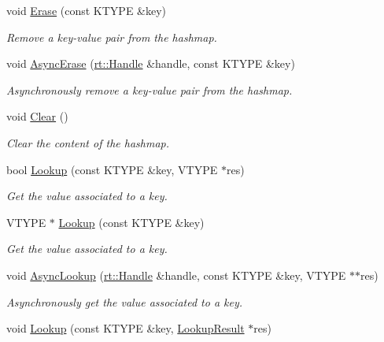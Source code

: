 \begin{DoxyCompactItemize}
void \hyperlink{classshad_1_1LocalHashmap_a5d57f63d0515acf2d53c99fb56eda93c}{Erase} (const K\-T\-Y\-P\-E \&key)
\begin{DoxyCompactList}\small\item\em Remove a key-\/value pair from the hashmap. \end{DoxyCompactList}\item 
void \hyperlink{classshad_1_1LocalHashmap_a78d00a5d4b2591cefcafb44247d9131d}{Async\-Erase} (\hyperlink{classshad_1_1rt_1_1Handle}{rt\-::\-Handle} \&handle, const K\-T\-Y\-P\-E \&key)
\begin{DoxyCompactList}\small\item\em Asynchronously remove a key-\/value pair from the hashmap. \end{DoxyCompactList}\item 
void \hyperlink{classshad_1_1LocalHashmap_a4e95baa9af6646d2c66adc1b8ae5781c}{Clear} ()
\begin{DoxyCompactList}\small\item\em Clear the content of the hashmap. \end{DoxyCompactList}\item 
bool \hyperlink{classshad_1_1LocalHashmap_a0365f5c68c75b04109639e8f65cc8eb0}{Lookup} (const K\-T\-Y\-P\-E \&key, V\-T\-Y\-P\-E $\ast$res)
\begin{DoxyCompactList}\small\item\em Get the value associated to a key. \end{DoxyCompactList}\item 
V\-T\-Y\-P\-E $\ast$ \hyperlink{classshad_1_1LocalHashmap_ae37645e79a683b4bc8c096a37cacf74d}{Lookup} (const K\-T\-Y\-P\-E \&key)
\begin{DoxyCompactList}\small\item\em Get the value associated to a key. \end{DoxyCompactList}\item 
void \hyperlink{classshad_1_1LocalHashmap_ab80af4eef1ce16673c1895bd6cd3951b}{Async\-Lookup} (\hyperlink{classshad_1_1rt_1_1Handle}{rt\-::\-Handle} \&handle, const K\-T\-Y\-P\-E \&key, V\-T\-Y\-P\-E $\ast$$\ast$res)
\begin{DoxyCompactList}\small\item\em Asynchronously get the value associated to a key. \end{DoxyCompactList}\item 
void \hyperlink{classshad_1_1LocalHashmap_a9bd1b3780c1c676ce8d5eae265030080}{Lookup} (const K\-T\-Y\-P\-E \&key, \hyperlink{structshad_1_1LocalHashmap_1_1LookupResult}{Lookup\-Result} $\ast$res)
$$
\end{DoxyCompactItemize}
